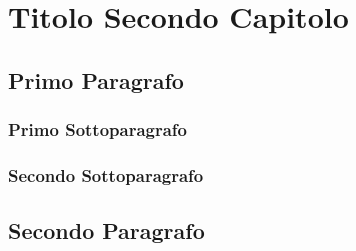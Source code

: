 \chapter{Titolo Secondo Capitolo}
\label{chap:titolocapitolo02}

\lipsum[1]

\section{Primo Paragrafo}
\lipsum[2-3]


\subsection{Primo Sottoparagrafo}
\lipsum[4-5]

\subsection{Secondo Sottoparagrafo}
\lipsum[6-7]

\section{Secondo Paragrafo}
\lipsum[1-7]

